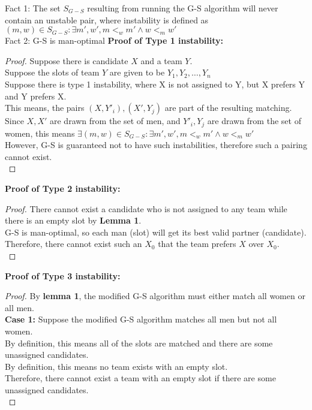 \begin{problem}
    \noindent
    Fact 1: The set $S_{G-S}$ resulting from running the G-S algorithm will never contain an unstable pair, where instability is defined as $(m,w) \in S_{G-S} : \exists m', w', m <_{w} m' \land w <_{m} w'$ \\
    Fact 2: G-S is man-optimal
    \noindent
    \textbf{Proof of Type 1 instability:}
    \begin{proof}
      Suppose there is candidate $X$ and a team $Y$. \\
      Suppose the slots of team $Y$ are given to be $Y_{1}, Y_{2}, \dots, Y_{n}$ \\
      Suppose there is type 1 instability, where X is not assigned to Y, but X prefers Y and Y prefers X. \\
      This means, the pairs $(X, Y'_i), (X', Y_j)$ are part of the resulting matching. \\
      Since $X, X'$ are drawn from the set of men, and $Y'_i, Y_j$ are drawn from the set of women, this means $\exists (m, w) \in S_{G-S} : \exists m', w', m <_{w} m' \land w <_{m} w'$ \\
      However, G-S is guaranteed not to have such instabilities, therefore such a pairing cannot exist. \\
    \end{proof}
    \noindent
    \textbf{Proof of Type 2 instability:}
    \begin{proof}
    There cannot exist a candidate who is not assigned to any team while there is an empty slot by \textbf{Lemma 1}. \\
    G-S is man-optimal, so each man (slot) will get its best valid partner (candidate). Therefore, there cannot exist such an $X_0$ that the team prefers $X$ over $X_0$. \\
    \end{proof}
    \noindent
    \textbf{Proof of Type 3 instability:}
    \begin{proof}
    By \textbf{lemma 1}, the modified G-S algorithm must either match all women or all men. \\
    \textbf{Case 1:} Suppose the modified G-S algorithm matches all men but not all women. \\
    By definition, this means all of the slots are matched and there are some unassigned candidates. \\
    By definition, this means no team exists with an empty slot. \\
    Therefore, there cannot exist a team with an empty slot if there are some unassigned candidates. \\

\end{proof}
\end{problem}
